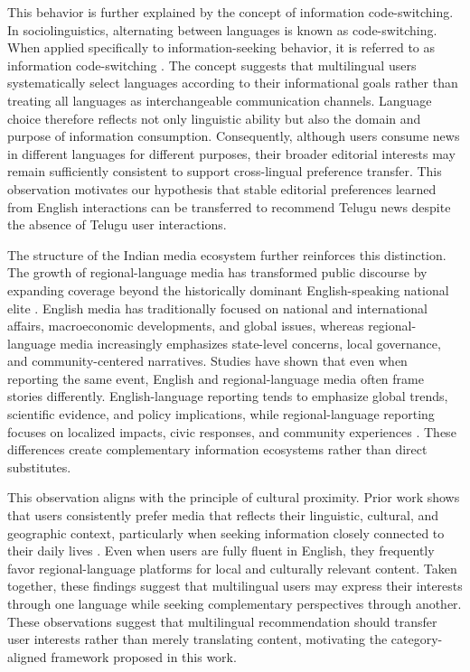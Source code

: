 \documentclass[conference]{IEEEtran}
\begin{document}
This behavior is further explained by the concept of information code-switching. In sociolinguistics, alternating between languages is known as code-switching. When applied specifically to information-seeking behavior, it is referred to as information code-switching \cite{CRL16765}. The concept suggests that multilingual users systematically select languages according to their informational goals rather than treating all languages as interchangeable communication channels. Language choice therefore reflects not only linguistic ability but also the domain and purpose of information consumption. Consequently, although users consume news in different languages for different purposes, their broader editorial interests may remain sufficiently consistent to support cross-lingual preference transfer. This observation motivates our hypothesis that stable editorial preferences learned from English interactions can be transferred to recommend Telugu news despite the absence of Telugu user interactions.

The structure of the Indian media ecosystem further reinforces this distinction. The growth of regional-language media has transformed public discourse by expanding coverage beyond the historically dominant English-speaking national elite \cite{neyazi2011politics}. English media has traditionally focused on national and international affairs, macroeconomic developments, and global issues, whereas regional-language media increasingly emphasizes state-level concerns, local governance, and community-centered narratives. Studies have shown that even when reporting the same event, English and regional-language media often frame stories differently. English-language reporting tends to emphasize global trends, scientific evidence, and policy implications, while regional-language reporting focuses on localized impacts, civic responses, and community experiences \cite{thaker2021environmentalism,takahashi2021handbook}. These differences create complementary information ecosystems rather than direct substitutes.

This observation aligns with the principle of cultural proximity. Prior work shows that users consistently prefer media that reflects their linguistic, cultural, and geographic context, particularly when seeking information closely connected to their daily lives \cite{ng2023web}. Even when users are fully fluent in English, they frequently favor regional-language platforms for local and culturally relevant content. Taken together, these findings suggest that multilingual users may express their interests through one language while seeking complementary perspectives through another. These observations suggest that multilingual recommendation should transfer user interests rather than merely translating content, motivating the category-aligned framework proposed in this work.
\end{document}
